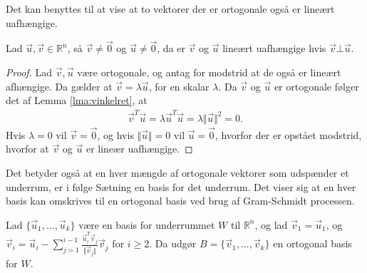 Det kan benyttes til at vise at to vektorer der er ortogonale også er lineært uafhængige.
\begin{lma}
Lad $\vec{u}, \vec{v} \in \mathds{R}^n$, så $\vec{v} \neq \vec{0}$ og $\vec{u} \neq \vec{0}$, da er $\vec{v}$ og $\vec{u}$ lineært uafhængige hvis $\vec{v} \bot \vec{u}$.
\label{lma:ortolinuaf}
\end{lma}
\begin{proof}
Lad $\vec{v}, \vec{u}$ være ortogonale, og antag for modstrid at de også er lineært afhængige.
Da gælder at $\vec{v} = \lambda \vec{u}$, for en skalar $\lambda$.
Da $\vec{v}$ og $\vec{u}$ er ortogonale følger det af Lemma \ref{lma:vinkelret}, at 
\begin{align*}
\vec{v}^T\vec{u} = \lambda\vec{u}^T\vec{u} = \lambda \Vert \vec{u} \Vert^2 = 0.
\end{align*}
Hvis $\lambda = 0$ vil $\vec{v}= \vec{0}$, og hvis $\Vert \vec{u} \Vert = 0$ vil $\vec{u} = \vec{0}$, hvorfor der er opstået modstrid, hvorfor at $\vec{v}$ og $\vec{u}$ er lineær uafhængige.
\end{proof}
Det betyder også at en hver mængde af ortogonale vektorer som udspænder et underrum, er i følge Sætning 
en basis for det underrum.
Det viser sig at en hver basis kan omskrives til en ortogonal basis ved brug af Gram-Schmidt processen.
\begin{stn}
Lad $\{\vec{u}_1, ..., \vec{u}_k\}$ være en basis for underrummet $W$ til $\mathds{R}^n$, og lad 
$\vec{v}_1 = \vec{u}_1$, og $\vec{v}_i= \vec{u}_i - \sum_{j=1}^{i-1} \frac{\vec{u}_i^T \vec{v}_j}{\Vert\vec{v}_j\Vert}\vec{v}_j$ for $i \geq 2$.
Da udgør $B = \{\vec{v}_1,..., \vec{v}_k\}$ en ortogonal basis for $W$.
\label{stn:gram}
\end{stn}
